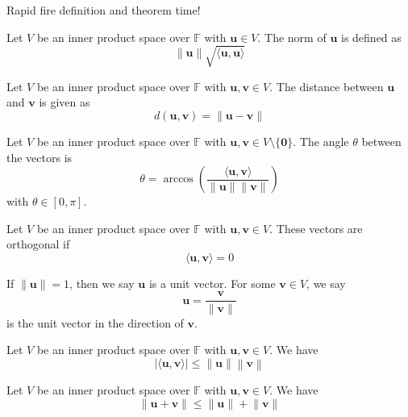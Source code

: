 Rapid fire definition and theorem time!
\begin{definition}[Norm]
    Let \(V\) be an inner product space over \(\mathbb{F} \) with \(\mathbf{u} \in V\). The norm of \(\mathbf{u} \) is defined as 
    \[
        \left\lVert \mathbf{u}  \right\rVert \sqrt{\langle \mathbf{u} ,\mathbf{u}  \rangle } 
    \]
\end{definition}
\begin{definition}[Distance]
    Let \(V\) be an inner product space over \(\mathbb{F} \) with \(\mathbf{u},\mathbf{v}  \in V\). The distance between \(\mathbf{u} \) and \(\mathbf{v} \) is given as 
    \[
        d(\mathbf{u} ,\mathbf{v} )=\left\lVert \mathbf{u} -\mathbf{v}  \right\rVert 
    \]
\end{definition}
\begin{definition}[Angle]
    Let \(V\) be an inner product space over \(\mathbb{F} \) with \(\mathbf{u},\mathbf{v}  \in V\setminus \{ \mathbf{0}  \} \). The angle \(\theta \) between the vectors is
    \[
        \theta =\arccos \left( \frac{\langle \mathbf{u} ,\mathbf{v}  \rangle }{\lVert \mathbf{u}  \rVert\lVert \mathbf{v}  \rVert  } \right) 
    \]
    with \(\theta \in [0,\pi ]\).
\end{definition}
\begin{definition}[Orthogonality]\label{orthowogonality}
    Let \(V\) be an inner product space over \(\mathbb{F} \) with \(\mathbf{u},\mathbf{v}  \in V\). These vectors are orthogonal if 
    \[
        \langle \mathbf{u} ,\mathbf{v}  \rangle=0 
    \]
\end{definition}
If \(\left\lVert \mathbf{u}  \right\rVert=1 \), then we say \(\mathbf{u} \) is a unit vector. For some \(\mathbf{v} \in V\), we say
\[
    \mathbf{u} =\frac{\mathbf{v} }{\lVert \mathbf{v}  \rVert }
\]
is the unit vector in the direction of \(\mathbf{v} \).
\begin{theorem}
    Let \(V\) be an inner product space over \(\mathbb{F} \) with \(\mathbf{u},\mathbf{v}  \in V\). We have 
    \[
        \left\vert \langle \mathbf{u} ,\mathbf{v}  \rangle  \right\vert \leq \left\lVert \mathbf{u}  \right\rVert\left\lVert \mathbf{v}  \right\rVert  
    \]
\end{theorem}
\begin{theorem}
    Let \(V\) be an inner product space over \(\mathbb{F} \) with \(\mathbf{u},\mathbf{v}  \in V\). We have 
    \[
        \left\lVert \mathbf{u} +\mathbf{v}  \right\rVert \leq \lVert \mathbf{u}  \rVert+\lVert \mathbf{v}  \rVert  
    \]
\end{theorem}

